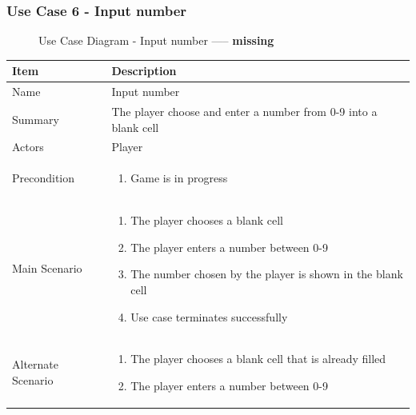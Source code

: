 \documentclass[12pt]{article}
\begin{document}
\newpage


\subsubsection{Use Case 6 - Input number} \label{uc:6}

\begin{figure}[htbp]
    \centering
    \caption{Use Case Diagram - Input number ----- \textbf{missing}}
\end{figure}

\begin{center}
\setlength{\tabcolsep}{18pt}
\renewcommand{\arraystretch}{1}
\begin{tabular}{ |p{3cm}|p{10cm}| }
    \hline
    \rowcolor{green}
   Item & Description \\
    \hline
    Name & Input number \\
    \hline
    Summary & The player choose and enter a number from 0-9 into a blank cell \\
    \hline
    Actors & Player \\
    \hline
    Precondition & 
    \vspace*{-0.2in}
    \begin{enumerate}
        \item Game is in progress
    \end{enumerate}  \\
    \hline
    Main Scenario &     
    \vspace*{-0.2in}
    \begin{enumerate}
        \item The player chooses a blank cell
        \item The player enters a number between 0-9
        \item The number chosen by the player is shown in the blank cell
        \item Use case terminates successfully
    \end{enumerate}  \\
    \hline
    Alternate Scenario &     
    \vspace*{-0.2in}
    \begin{enumerate}
        \item The player chooses a blank cell that is already filled
        \item The player enters a number between 0-9

\end{enumerate}
\end{tabular}
\end{center}
\end{document}
